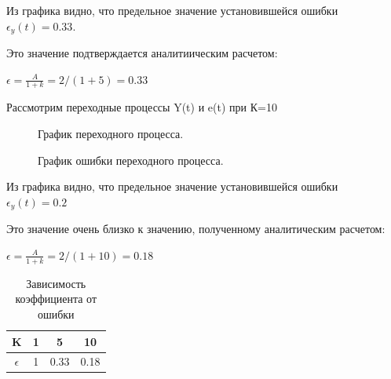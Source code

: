 \documentclass[a4paper, 11pt]{article}
\begin{document}
\normalsize{Из графика видно, что предельное значение установившейся ошибки \\ $\epsilon_y(t)=0.33$.

Это значение подтверждается аналитиическим расчетом:

$\epsilon=\frac {A}{1+k} = 2/(1+5) = 0.33$}
\newpage
\normalsize{Рассмотрим переходные процессы Y(t) и e(t) при К=10}
\begin{figure}[h]
    \caption{График переходного процесса.}
    \label{four}
\end{figure}
\begin{figure}[h]
    \caption{График ошибки переходного процесса.}
    \label{tree}
\end{figure}

\normalsize{Из графика видно, что предельное значение установившейся ошибки \\ $\epsilon_y(t)=0.2$

Это значение очень близко к значению, полученному аналитическим расчетом: 

$\epsilon=\frac {A}{1+k} = 2/(1+10) = 0.18$}

\begin{table}[h]
    \begin{center}
    \begin{tabular}{|c|c|c|c|}
    \hline
         K & 1 & 5 & 10 \\
         \hline
         $\epsilon$ & 1 & 0.33 & 0.18 \\
    \hline     
    \end{tabular}
    \caption{Зависимость коэффициента от ошибки}
    \label{tab:my_label}
    \end{center}
\end{table}
\end{document}
